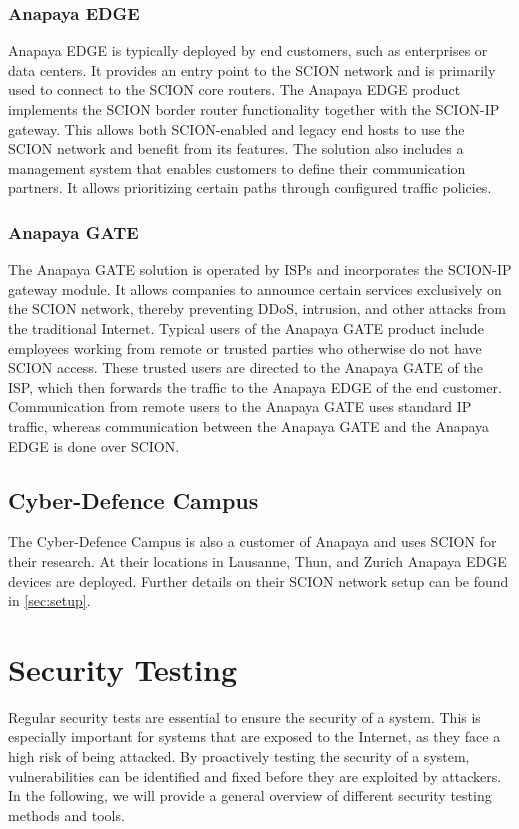 \subsubsection{Anapaya EDGE}
Anapaya EDGE is typically deployed by end customers, such as enterprises or data centers.
It provides an entry point to the SCION network and is primarily used to connect to the SCION core routers.
The Anapaya EDGE product implements the SCION border router functionality together with the SCION-IP gateway.
This allows both SCION-enabled and legacy end hosts to use the SCION network and benefit from its features.
The solution also includes a management system that enables customers to define their communication partners.
It allows prioritizing certain paths through configured traffic policies.

\subsubsection{Anapaya GATE}
The Anapaya GATE solution is operated by ISPs and incorporates the SCION-IP gateway module.
It allows companies to announce certain services exclusively on the SCION network, thereby preventing DDoS, intrusion, and other attacks from the traditional Internet.
Typical users of the Anapaya GATE product include employees working from remote or trusted parties who otherwise do not have SCION access.
These trusted users are directed to the Anapaya GATE of the ISP, which then forwards the traffic to the Anapaya EDGE of the end customer.
Communication from remote users to the Anapaya GATE uses standard IP traffic, whereas communication between the Anapaya GATE and the Anapaya EDGE is done over SCION.

\subsection{Cyber-Defence Campus}
The Cyber-Defence Campus is also a customer of Anapaya and uses SCION for their research.
At their locations in Lausanne, Thun, and Zurich Anapaya EDGE devices are deployed.
Further details on their SCION network setup can be found in \cref{sec:setup}.



\section{Security Testing}
\label{sec:security_testing}
Regular security tests are essential to ensure the security of a system.
This is especially important for systems that are exposed to the Internet, as they face a high risk of being attacked.
By proactively testing the security of a system, vulnerabilities can be identified and fixed before they are exploited by attackers.
In the following, we will provide a general overview of different security testing methods and tools.

